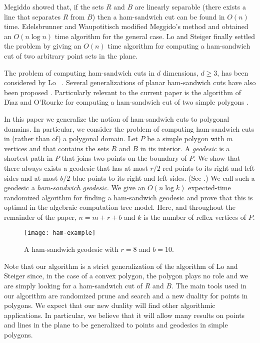 \documentclass[charterfonts,lotsofwhite]{patmorin}
\begin{document}
Megiddo \cite{m85} showed that, if the sets $R$ and $B$ are linearly
separable (there exists a line that separates $R$ from $B$) then a
ham-sandwich cut can be found in $O(n)$ time.  Edelsbrunner and
Waupotitisch \cite{ew86} modified Meggido's method and obtained an
$O(n\log n)$ time algorithm for the general case.  Lo and Steiger
\cite{ls90} finally settled the problem by giving an $O(n)$ time
algorithm for computing a ham-sandwich cut of two arbitrary point sets
in the plane.

The problem of computing ham-sandwich cuts in $d$ dimensions, $d\ge
3$, has been considered by Lo \etal\ \cite{lms94}.  Several
generalizations of planar ham-sandwich cuts have also been proposed
\cite{anru98,bks00,bl05,iuy98a,iuy98b}. Particularly relevant to the
current paper is the algorithm of D{\'\i}az and O'Rourke for computing
a ham-sandwich cut of two simple polygons \cite{do90}. 

In this paper we generalize the notion of ham-sandwich cuts to
polygonal domains.  In particular, we consider the problem of
computing ham-sandwich cuts in (rather than of) a polygonal domain.
Let $P$ be a simple polygon with $m$ vertices and that contains the
sets $R$ and $B$ in its interior.  A \emph{geodesic} is a shortest
path in $P$ that joins two points on the boundary of $P$.  We show
that there always exists a geodesic that has at most $r/2$ red points
to its right and left sides and at most $b/2$ blue points to its right
and left sides.  (See .) We call such a geodesic a
\emph{ham-sandwich geodesic}.  We give an $O(n\log k)$ expected-time
randomized algorithm for finding a ham-sandwich geodesic and prove
that this is optimal in the algebraic computation tree model.  Here,
and throughout the remainder of the paper, $n=m+r+b$ and $k$ is the
number of reflex vertices of $P$.

\begin{figure}[htbp]
\begin{center}
\texttt{[image: ham-example]}
\end{center}
\caption{A ham-sandwich geodesic with $r=8$ and $b=10$.}
\end{figure}


Note that our algorithm is a strict generalization of the algorithm of
Lo and Steiger since, in the case of a convex polygon, the polygon
plays no role and we are simply looking for a ham-sandwich cut of $R$
and $B$.  The main tools used in our algorithm are randomized prune
and search \cite{m83} and a new duality for points in polygons.  We
expect that our new duality will find other algorithmic applications.
In particular, we believe that it will allow many results on points
and lines in the plane to be generalized to points and geodesics in
simple polygons.
\end{document}
